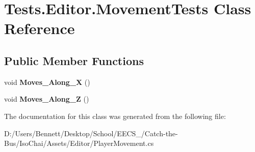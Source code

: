 \hypertarget{class_tests_1_1_editor_1_1_movement_tests}{}\section{Tests.\+Editor.\+Movement\+Tests Class Reference}
\label{class_tests_1_1_editor_1_1_movement_tests}
\subsection*{Public Member Functions}
\begin{DoxyCompactItemize}
\item 
\mbox{\label{class_tests_1_1_editor_1_1_movement_tests_a69110c60d7c62342f87f9fa41661a1a1}} 
void {\bfseries Moves\+\_\+\+Along\+\_\+X} ()
\item 
\mbox{\label{class_tests_1_1_editor_1_1_movement_tests_a7635c760603c1a246b8014796e8a4377}} 
void {\bfseries Moves\+\_\+\+Along\+\_\+Z} ()
\end{DoxyCompactItemize}


The documentation for this class was generated from the following file\+:\begin{DoxyCompactItemize}
\item 
D\+:/\+Users/\+Bennett/\+Desktop/\+School/\+E\+E\+C\+S\+\_/\+Catch-\/the-\/\+Bus/\+Iso\+Chai/\+Assets/\+Editor/Player\+Movement.\+cs\end{DoxyCompactItemize}
